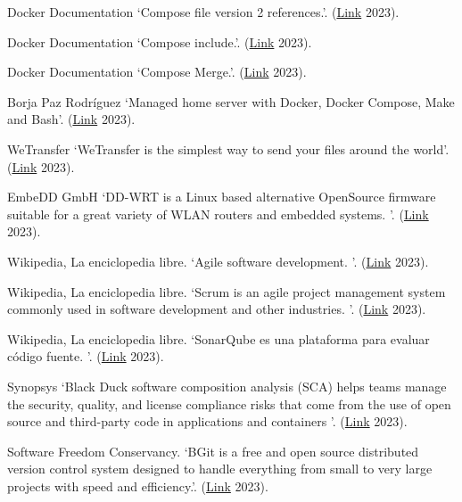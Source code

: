 \documentclass[spanish,final]{setup/eetac_tfc_pfc}
\begin{document}
\begin{thebibliography}{2}
Docker Documentation
`Compose file version 2 references.'.
(\href{https://docs.docker.com/compose/compose-file/compose-file-v3/}{Link} 2023).

Docker Documentation
`Compose include.'.
(\href{https://docs.docker.com/compose/multiple-compose-files/include/}{Link} 2023).

Docker Documentation
`Compose Merge.'.
(\href{https://docs.docker.com/compose/multiple-compose-files/merge/}{Link} 2023).

Borja Paz Rodríguez
`Managed home server with Docker, Docker Compose, Make and Bash'.
(\href{https://github.com/borjapazr/mars-server}{Link} 2023).

WeTransfer
`WeTransfer is the simplest way to send your files around the world'.
(\href{https://wetransfer.com/}{Link} 2023).

EmbeDD GmbH
`DD-WRT is a Linux based alternative OpenSource firmware suitable for a great variety of WLAN routers and embedded systems. '.
(\href{https://dd-wrt.com/}{Link} 2023).

Wikipedia, La enciclopedia libre.
`Agile software development. '.
(\href{https://en.wikipedia.org/wiki/Agile_software_development}{Link} 2023).

Wikipedia, La enciclopedia libre.
`Scrum is an agile project management system commonly used in software development and other industries. '.
(\href{https://en.wikipedia.org/wiki/Scrum_(software_development)}{Link} 2023).

Wikipedia, La enciclopedia libre.
`SonarQube es una plataforma para evaluar código fuente. '.
(\href{https://en.wikipedia.org/wiki/SonarQube}{Link} 2023).

Synopsys
`Black Duck software composition analysis (SCA) helps teams manage the security, quality, and license compliance risks that come from the use of open source and third-party code in applications and containers '.
(\href{https://www.synopsys.com/software-integrity/security-testing/software-composition-analysis.html}{Link} 2023).

Software Freedom Conservancy.
`BGit is a free and open source distributed version control system designed to handle everything from small to very large projects with speed and efficiency.'.
(\href{https://git-scm.com/}{Link} 2023).


\end{thebibliography}
\end{document}
